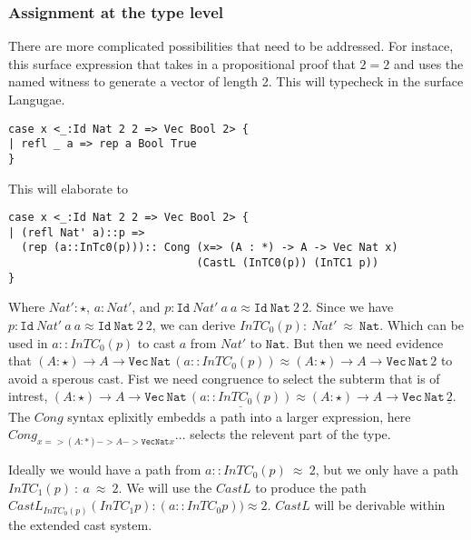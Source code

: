 
\subsubsection{Assignment at the type level}

There are more complicated possibilities that need to be addressed.
For instace, this surface expression that takes in a propositional proof that $2=2$ and uses the named witness to generate a vector of length 2.
This will typecheck in the surface Langugae.

\begin{lstlisting}[basicstyle={\ttfamily\small}]
case x <_:Id Nat 2 2 => Vec Bool 2> {
| refl _ a => rep a Bool True
}
\end{lstlisting}

This will elaborate to

\begin{lstlisting}[basicstyle={\ttfamily\small}]
case x <_:Id Nat 2 2 => Vec Bool 2> {
| (refl Nat' a)::p => 
  (rep (a::InTc0(p))):: Cong (x=> (A : *) -> A -> Vec Nat x)
                             (CastL (InTC0(p)) (InTC1 p))
}
\end{lstlisting}

Where $Nat':\star$, $a:Nat'$, and $p:\mathtt{Id}\ Nat'\ a\ a\approx\mathtt{Id}\ \mathtt{Nat}\ 2\ 2$.
Since we have $p:\mathtt{Id}\ Nat'\ a\ a\approx\mathtt{Id}\ \mathtt{Nat}\ 2\ 2$, we can derive $InTC_{0}(p):\ Nat'\ \approx\ \mathtt{Nat}$.
Which can be used in $a::InTC_{0}(p)$ to cast $a$ from $Nat'$ to $\mathtt{Nat}$.
But then we need evidence that $(A:\star)\rightarrow A\rightarrow\mathtt{Vec}\,\mathtt{Nat}\,(a::InTC_{0}(p))\approx(A:\star)\rightarrow A\rightarrow\mathtt{Vec}\,\mathtt{Nat}\,2$ to avoid a sperous cast.
Fist we need congruence to select the subterm that is of intrest, $(A:\star)\rightarrow A\rightarrow\mathtt{Vec}\,\mathtt{Nat}\,\underline{(a::InTC_{0}(p))}\approx(A:\star)\rightarrow A\rightarrow\mathtt{Vec}\,\mathtt{Nat}\,\underline{2}$.
The $Cong$ syntax eplixitly embedds a  path into a larger expression, here $Cong_{x=> (A : *) -> A -> \mathtt{Vec} \mathtt{Nat} x} ...$ selects the relevent part of the type.

Ideally we would have a path from $a::InTC_{0}(p)\ \approx\ 2$, but we only have a path $InTC_{1}(p)\ :\ a\ \approx\ 2$.
We will use the $CastL$ to produce the path $CastL_{InTC_{0}(p)}\left(InTC_{1}p\right):(a::InTC_{0}p))\approx2$.
$CastL$ will be derivable within the extended cast system.

